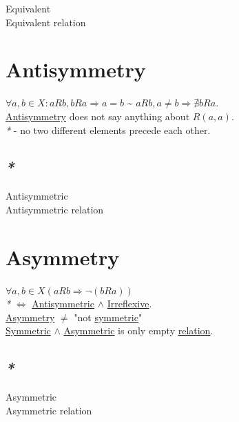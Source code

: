 \documentclass[a4paper,14pt,oneside]{book}
\begin{document}
\label{org5031093}Equivalent\\
\label{org10e7b1d}Equivalent relation\\

\section{\label{orgaab8cc0}Antisymmetry}
\label{sec:org709fb7e}

\(\forall a, b \in X : aRb, bRa \Rightarrow a = b\) \textasciitilde{} \(aRb, a \ne b \Rightarrow \nexists bRa\).\\
\hyperref[orgaab8cc0]{Antisymmetry} does not say anything about \(R(a,a)\).\\

\emph{*} - no two different elements precede each other.\\

\subsection{\emph{*}}
\label{sec:org6e740b6}

\label{org68e0dbc}Antisymmetric\\
\label{org9f586e2}Antisymmetric relation\\

\section{\label{org86fae43}Asymmetry}
\label{sec:orgb5015c5}

\(\forall a,b \in X (aRb \Rightarrow \neg (bRa))\)\\
\emph{*} \(\iff\) \hyperref[org68e0dbc]{Antisymmetric} \(\land\) \hyperref[org644a55b]{Irreflexive}.\\
\hyperref[org86fae43]{Asymmetry} \(\ne\) "not \hyperref[orgfd0a88e]{symmetric}"\\
\hyperref[orgfd0a88e]{Symmetric} \(\land\) \hyperref[org23b900b]{Asymmetric} is only empty \hyperref[org6396c35]{relation}.\\

\subsection{\emph{*}}
\label{sec:org0fdbf97}

\label{org23b900b}Asymmetric\\
\label{org98c7bb6}Asymmetric relation\\
\end{document}
